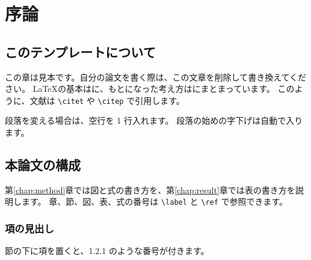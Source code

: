\chapter{序論}\label{chap:intro}

\section{このテンプレートについて}
この章は見本です。自分の論文を書く際は、この文章を削除して書き換えてください。
\LaTeX{}の基本は\citet{okumura2020}に、もとになった考え方は\citet{lamport1994}にまとまっています。
このように、文献は \verb|\citet| や \verb|\citep| で引用します\citep{lamport1994}。

段落を変える場合は、空行を 1 行入れます。
段落の始めの字下げは自動で入ります。

\section{本論文の構成}
第\ref{chap:method}章では図と式の書き方を、第\ref{chap:result}章では表の書き方を説明します。
章、節、図、表、式の番号は \verb|\label| と \verb|\ref| で参照できます。

\subsection{項の見出し}
節の下に項を置くと、1.2.1 のような番号が付きます。
